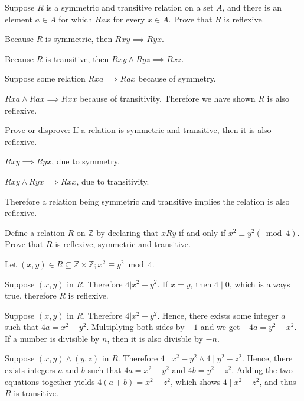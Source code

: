 \documentclass{article}
\begin{document}
\begin{exercise}{}{}{Suppose $R$ is a symmetric and transitive relation on a
		set $A$, and there is an element $a \in A$ for which $Rax$ for every $x
			\in A$. Prove that $R$ is reflexive.}
	\tcblower
	\begin{alist}
		\item Because $R$ is symmetric, then $Rxy \implies Ryx$.
		\item Because $R$ is transitive, then $R x y \land Ryz \implies Rxz$.
		\item Suppose some relation $Rxa\implies Rax$ because of symmetry.
		\item $Rxa \land Rax \implies Rxx$ because of transitivity. Therefore we have
		shown $R$ is also reflexive.
	\end{alist}
\end{exercise}{}{}

\begin{exercise}{}{}{Prove or disprove: If a relation is symmetric and
		transitive, then it is also reflexive.}
	\tcblower
	\begin{alist}
		\item $Rxy \implies Ryx$, due to symmetry.
		\item $Rxy \land Ryx \implies Rxx$, due to transitivity.
		\item Therefore a relation being symmetric and transitive implies the relation
		is also reflexive.
	\end{alist}
\end{exercise}{}{}

\begin{exercise}{}{}{Define a relation $R$ on $\mathbb{Z}$ by declaring that
		$x R y$ if and only if $x^2 \equiv y^2(\bmod 4)$. Prove that $R$ is
		reflexive, symmetric and transitive.}
	\tcblower
	\begin{alist}
		\item Let $(x, y) \in R\subseteq \mathbb{Z}\times\mathbb{Z}; x^2\equiv y^2\bmod 4$.
		\item Suppose $(x, y)$ in $R$. Therefore $4 | x^2 - y^2$. If $x=y$, then $4\mid
			0$, which is always true, therefore $R$ is reflexive.
		\item Suppose $(x, y)$ in $R$. Therefore $4 | x^2 - y^2$. Hence, there exists
		some integer $a$ such that $4a = x^2-y^2$. Multiplying both sides by $-1$
		and we get $-4a = y^2-x^2$.  If a number is divisible by $n$, then it is also
		divisble by $-n$.
		\item Suppose $(x, y)\land (y, z)$ in $R$. Therefore $4 \mid x^2 - y^2 \land
			4\mid y^2-z^2$. Hence, there exists integers $a$ and $b$ such that $4a =
			x^2-y^2$ and $4b=y^2-z^2$. Adding the two equations together yields
		$4(a+b) = x^2 -z^2$, which shows $4\mid x^2 - z^2$, and thus $R$ is
		transitive.
	\end{alist}
\end{exercise}{}{}
\end{document}

